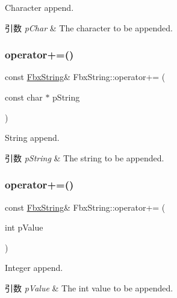 Character append. 
\begin{DoxyParams}{引数}
{\em p\+Char} & The character to be appended. \\
\hline
\end{DoxyParams}
\mbox{\label{class_fbx_string_afcc126dca4201a6bfa479c18fb2aa0d4}} 
\subsubsection{\texorpdfstring{operator+=()}{operator+=()}\hspace{0.1cm}{\footnotesize\ttfamily [3/6]}}
{\footnotesize\ttfamily const \hyperlink{class_fbx_string}{Fbx\+String}\& Fbx\+String\+::operator+= (\begin{DoxyParamCaption}\item[{const char $\ast$}]{p\+String }\end{DoxyParamCaption})}

String append. 
\begin{DoxyParams}{引数}
{\em p\+String} & The string to be appended. \\
\hline
\end{DoxyParams}
\mbox{\label{class_fbx_string_a1b781182f59fa46198100dc1e8cf5fdf}} 
\subsubsection{\texorpdfstring{operator+=()}{operator+=()}\hspace{0.1cm}{\footnotesize\ttfamily [4/6]}}
{\footnotesize\ttfamily const \hyperlink{class_fbx_string}{Fbx\+String}\& Fbx\+String\+::operator+= (\begin{DoxyParamCaption}\item[{int}]{p\+Value }\end{DoxyParamCaption})}

Integer append. 
\begin{DoxyParams}{引数}
{\em p\+Value} & The int value to be appended. \\
\hline
\end{DoxyParams}
\mbox{\label{class_fbx_string_acb85bfcca479b678f47f7077ca7e3c37}} 
